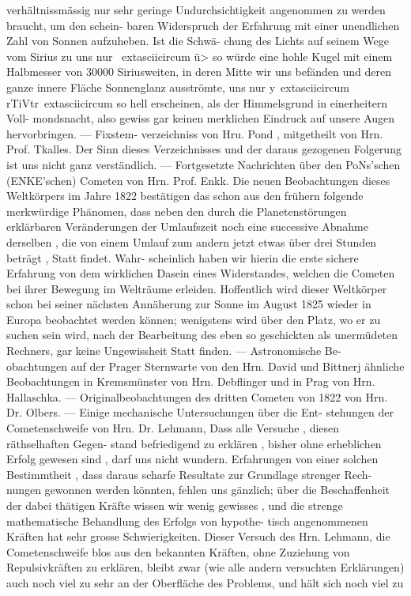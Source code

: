 \documentclass[12pt,a4paper]{article}
\begin{document}
{{{{{{{{verhältnissmässig  nur  sehr  geringe  Undurchsichtigkeit  angenommen  zu  werden  braucht,  um  den  schein- baren Widerspruch  der  Erfahrung  mit  einer  unendlichen  Zahl  von  Sonnen  aufzuheben.     Ist  die  Schwä- chung des  Lichts  auf  seinem  Wege  vom  Sirius  zu  uns  nur  \	extasciicircum{}{ }ü>    so  würde   eine  hohle  Kugel  mit  einem Halbmesser  von  30000  Siriusweiten,   in  deren  Mitte  wir  uns  befänden   und   deren   ganze    innere    Fläche Sonnenglanz  ausströmte,  uns  nur  y\	extasciicircum{}{ }rTiVtr\	extasciicircum{}{ }  so  hell  erscheinen,  als  der  Himmelsgrund  in  einerheitern  Voll- mondsnacht, also  gewiss  gar  keinen  merklichen  Eindruck  auf  unsere  Augen  hervorbringen.  ---  Fixstem- verzeichniss  von  Hru.  Pond  ,  mitgetheilt  von  Hrn.  Prof.  Tkalles.    Der  Sinn  dieses  Verzeichnisses  und  der daraus  gezogenen  Folgerung   ist  uns   nicht  ganz    verständlich.  ---      Fortgesetzte    Nachrichten   über  den PoNs'schen  (ENKE'schen)  Cometen  von  Hrn.   Prof.  Enkk.      Die   neuen   Beobachtungen   dieses  Weltkörpers im  Jahre  1822  bestätigen  das  schon   aus  den  frühern  folgende  merkwürdige  Phänomen,   dass  neben  den durch  die  Planetenstörungen  erklärbaren  Veränderungen  der  Umlaufszeit  noch  eine  successive  Abnahme derselben ,  die  von  einem  Umlauf  zum  andern  jetzt  etwas  über  drei  Stunden  beträgt ,  Statt  findet.     Wahr- scheinlich haben  wir  hierin  die  erste  sichere  Erfahrung  von  dem  wirklichen  Dasein   eines  Widerstandes, welchen  die  Cometen  bei  ihrer  Bewegung  im  Welträume  erleiden.     Hoffentlich  wird  dieser  Weltkörper schon  bei  seiner  nächsten  Annäherung  zur  Sonne  im  August  1825  wieder  in  Europa  beobachtet  werden können;  wenigstens  wird  über  den  Platz,  wo  er  zu  suchen  sein  wird,    nach    der  Bearbeitung  des  eben so  geschickten  als  unermüdeten  Rechners,  gar  keine  Ungewissheit  Statt  finden.  ---      Astronomische  Be- obachtungen  auf  der  Prager  Sternwarte  von  den  Hrn.  David  und  Bittnerj   ähnliche  Beobachtungen  in Kremsmünster  von  Hrn.  Debflinger  und  in  Prag  von  Hrn.  Hallaschka.  ---     Originalbeobachtungen   des dritten  Cometen  von  1822  von  Hrn.  Dr.  Olbers.  ---      Einige  mechanische  Untersuchungen  über  die  Ent- stehungen der  Cometenschweife  von  Hrn.  Dr.  Lehmann,     Dass  alle  Versuche ,  diesen  räthselhaften  Gegen- stand befriedigend  zu  erklären ,  bisher  ohne  erheblichen  Erfolg  gewesen  sind ,    darf  uns  nicht   wundern. Erfahrungen  von  einer  solchen  Bestimmtheit ,  dass  daraus  scharfe  Resultate  zur  Grundlage  strenger  Rech- nungen   gewonnen  werden  könnten,  fehlen    uns  gänzlich;    über   die  Beschaffenheit  der  dabei  thätigen Kräfte  wissen  wir  wenig  gewisses ,  und  die  strenge  mathematische  Behandlung  des  Erfolgs  von  hypothe- tisch angenommenen  Kräften  hat  sehr  grosse  Schwierigkeiten.      Dieser  Versuch   des  Hrn.  Lehmann,    die Cometenschweife    blos    aus    den  bekannten  Kräften,   ohne  Zuziehung   von    Repulsivkräften  zu   erklären, bleibt  zwar  (wie  alle  andern   versuchten  Erklärungen)   auch   noch    viel  zu   sehr   an  der  Oberfläche  des Problems,  und  hält  sich  noch  viel  zu }}}}}}}}
\end{document}
